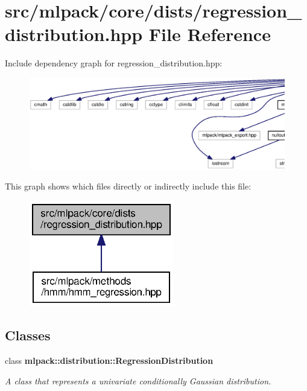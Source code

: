 \section{src/mlpack/core/dists/regression\+\_\+distribution.hpp File Reference}
\label{regression__distribution_8hpp}
Include dependency graph for regression\+\_\+distribution.\+hpp\+:
\nopagebreak
\begin{figure}[H]
\begin{center}
\leavevmode
\includegraphics[width=350pt]{regression__distribution_8hpp__incl}
\end{center}
\end{figure}
This graph shows which files directly or indirectly include this file\+:
\nopagebreak
\begin{figure}[H]
\begin{center}
\leavevmode
\includegraphics[width=180pt]{regression__distribution_8hpp__dep__incl}
\end{center}
\end{figure}
\subsection*{Classes}
\begin{DoxyCompactItemize}
\item 
class {\bf mlpack\+::distribution\+::\+Regression\+Distribution}
\begin{DoxyCompactList}\small\item\em A class that represents a univariate conditionally Gaussian distribution. \end{DoxyCompactList}\end{DoxyCompactItemize}
